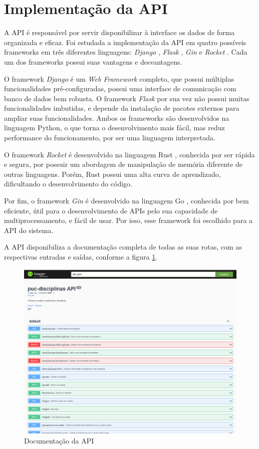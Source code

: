 \section{Implementação da API}
\label{sec:Implementação da API}

A API é responsável por servir disponibilizar à interface os dados de forma organizada e eficaz. Foi estudada a implementação da API em quatro possíveis frameworks em três diferentes linguagens:
\textit{Django} \cite{site-django}, \textit{Flask} \cite{site-flask}, \textit{Gin} \cite{site-gin} e \textit{Rocket} \cite{site-rocket}. Cada um dos frameworks possui suas vantagens e desvantagens.

O framework \textit{Django} é um \textit{Web Framework} completo, que possui múltiplas funcionalidades pré-configuradas, possui uma interface de comunicação com banco de dados bem robusta. O framework \textit{Flask} por sua vez não possui muitas funcionalidades imbutidas, e depende da instalação de pacotes externos para ampliar suas funcionalidades. Ambos os frameworks são desenvolvidos na linguagem Python, o que torna o desenvolvimento mais fácil, mas reduz performance do funcionamento, por ser uma linguagem interpretada.

O framework \textit{Rocket} é desenvolvido na linguagem Rust \cite{site-rust}, conhecida por ser rápida e segura, por possuir um abordagem de manipulação de memória diferente de outras linguagens. Porém, Rust possui uma alta curva de aprendizado, dificultando o desenvolvimento do código.

Por fim, o framework \textit{Gin} é desenvolvido na linguagem Go \cite{site-go}, conhecida por bem eficiente, útil para o desenvolvimento de APIs pelo sua capacidade de multiprocessamento, e fácil de usar. Por isso, esse framework foi escolhido para a API do sistema.

A API disponibiliza a documentação completa de todas as suas rotas, com as respectivas entradas e saídas, conforme a figura \ref{fig:api}.

\begin{figure}[ht]
    \begin{center}
    \includegraphics[width=360pt]{figuras/api.png}
    \caption{Documentação da API}
    \label{fig:api}
    \end{center}
\end{figure}

